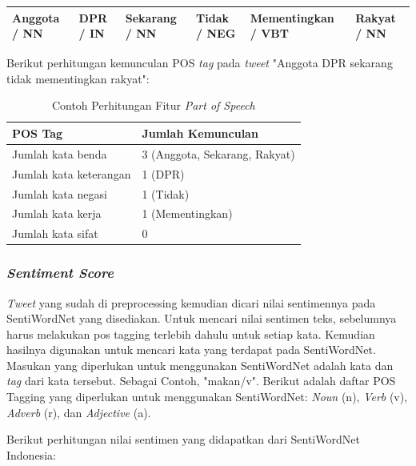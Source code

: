 \begin{table}[H]
	\centering
	\small
	\begin{adjustbox}{width=1\textwidth}
	\begin{tabular}{|p{2cm}|p{2cm}|p{2cm}|p{1.3cm}|p{3cm}|p{1cm}|}
		\hline
		Anggota / NN & DPR / IN & Sekarang / NN & Tidak / NEG & Mementingkan / 
		VBT & Rakyat / NN \\
		\hline
	\end{tabular}
	\end{adjustbox}
\end{table}
Berikut perhitungan kemunculan POS \textit{tag} pada \textit{tweet} "Anggota DPR sekarang tidak mementingkan rakyat":
\begin{table}[H]
	\caption{Contoh Perhitungan Fitur \textit{Part of Speech}}
	\centering
	\small
	\begin{adjustbox}{width=1\textwidth}
	\begin{tabular}{|p{7cm}|p{6cm}|}
		\hline
		\textbf{POS Tag} & \textbf{Jumlah Kemunculan} \\
		\hline
		Jumlah kata benda & 3 (Anggota, Sekarang, Rakyat) \\
		\hline
		Jumlah kata keterangan & 1 (DPR) \\
		\hline
		Jumlah kata negasi & 1 (Tidak) \\
		\hline
		Jumlah kata kerja & 1 (Mementingkan) \\
		\hline
		Jumlah kata sifat & 0 \\
		\hline
	\end{tabular}
	\end{adjustbox}
\end{table}

\subsubsection{\textit{Sentiment Score}}
\textit{Tweet} yang sudah di preprocessing kemudian dicari nilai sentimennya pada SentiWordNet yang disediakan. Untuk mencari nilai sentimen teks, sebelumnya harus melakukan pos tagging terlebih dahulu untuk setiap kata. Kemudian hasilnya digunakan untuk mencari kata yang terdapat pada SentiWordNet. Masukan yang diperlukan untuk menggunakan SentiWordNet adalah kata dan \textit{tag} dari kata tersebut. Sebagai 
Contoh, "makan/v". Berikut adalah daftar POS Tagging yang diperlukan untuk menggunakan SentiWordNet: \textit{Noun} (n), \textit{Verb} (v), \textit{Adverb} (r), dan \textit{Adjective} (a).

Berikut perhitungan nilai sentimen yang didapatkan dari SentiWordNet Indonesia:

